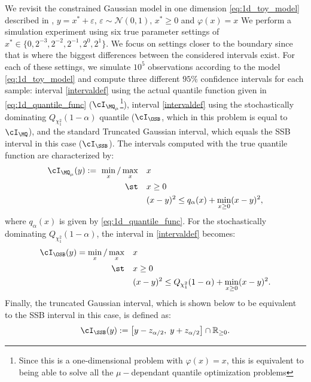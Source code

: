 \documentclass[11pt]{article}
\numberwithin{equation}{section}
\numberwithin{figure}{section}
\begin{document}
We revisit the constrained Gaussian model in one dimension \eqref{eq:1d_toy_model} described in , $y= x^* + \varepsilon, \, \varepsilon \sim \mathcal{N}(0,1), \, x^* \geq 0$ and $\varphi(x) = x$
We perform a simulation experiment using six true parameter settings of $x^* \in \{0, 2^{-3}, 2^{-2}, 2^{-1}, 2^0, 2^1 \}$. 
We focus on settings closer to the boundary since that is where the biggest differences between the considered intervals exist. 
For each of these settings, we simulate $10^5$ observations according to the model \eqref{eq:1d_toy_model} and compute three different $95\%$ confidence intervals for each sample: interval \eqref{intervaldef} using the actual quantile function given in \eqref{eq:1d_quantile_func} ($\cI_{\MQ_\mu}$\footnote{Since this is a one-dimensional problem with $\varphi(x) = x$, this is equivalent to being able to solve all the $\mu-$dependant quantile optimization problems}), interval \eqref{intervaldef} using the stochastically dominating $Q_{\chi^2_1}(1 - \alpha)$ quantile ($\cI_{\OSB}$, which in this problem is equal to $\cI_{\MQ}$), and the standard Truncated Gaussian interval, which equals the SSB interval in this case ($\cI_{\SSB}$). 
The intervals computed with the true quantile function are characterized by:
\begin{equation}\label{opt4new1d_quantile}
\begin{aligned}
\cI_{\MQ_\mu}(y) 
:=~ 
\min_{x}/\max_{x} \quad & x \\
\st \quad & x \geq 0\\
& (x-y)^2 \leq q_\alpha(x) + \min_{x \geq 0} (x-y)^2,
\end{aligned}
\end{equation}
where $q_\alpha(x)$ is given by \eqref{eq:1d_quantile_func}.
For the stochastically dominating $Q_{\chi^2_1}(1 - \alpha)$, the interval in \eqref{intervaldef} becomes:
\begin{equation}\label{opt4new1d}
\begin{aligned}
\cI_{\OSB}(y) 
=  \min_{x}/\max_{x} \quad & x \\
\st \quad & x \geq 0\\
& (x-y)^2 \leq Q_{\chi^2_1}(1 - \alpha) + \min_{x \geq 0} (x-y)^2.
\end{aligned}
\end{equation}
Finally, the truncated Gaussian interval, which is shown below to be equivalent to the SSB interval in this case, is defined as:
\begin{equation}\label{eq:TG1D}
    \cI_{\SSB}(y) := \left[ y - z_{\alpha / 2},\; y + z_{\alpha / 2} \right] \cap \mathbb{R}_{\ge 0}.
\end{equation}
\end{document}
